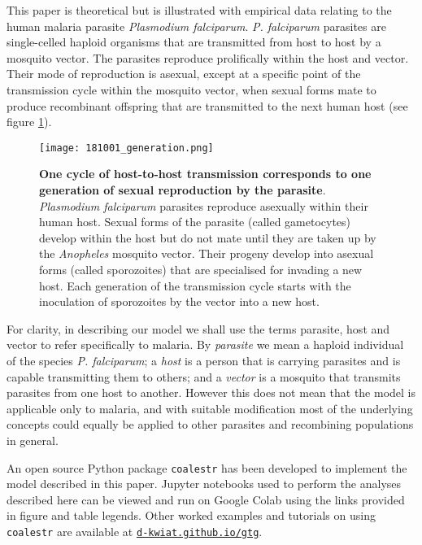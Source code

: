 \documentclass[_main.tex]{subfiles}
\begin{document}
This paper is theoretical but is illustrated with empirical data relating to the human malaria parasite \textit{Plasmodium falciparum}.  \textit{P. falciparum} parasites are single-celled haploid organisms that are transmitted from host to host by a mosquito vector.  The parasites reproduce prolifically within the host and vector.  Their mode of reproduction is asexual, except at a specific point of the transmission cycle within the mosquito vector, when sexual forms mate to produce recombinant offspring that are transmitted to the next human host (see figure \ref{fig:one_generation}).

\begin{figure}[h!]
\centering
\texttt{[image: 181001\_generation.png]}
\caption{\textbf{One cycle of host-to-host transmission corresponds to one generation of sexual reproduction by the parasite}.  \textit{Plasmodium falciparum} parasites reproduce asexually within their human host.  Sexual forms of the parasite (called gametocytes) develop within the host but do not mate until they are taken up by the \textit{Anopheles} mosquito vector.  Their progeny develop into asexual forms (called sporozoites) that are specialised for invading a new host.  Each generation of the transmission cycle starts with the inoculation of sporozoites by the vector into a new host.
}
\label{fig:one_generation}
\end{figure}

For clarity, in describing our model we shall use the terms parasite, host and vector to refer specifically to malaria.  By \textit{parasite} we mean a haploid individual of the species \textit{P. falciparum}; a \textit{host} is a person that is carrying parasites and is capable transmitting them to others; and a \textit{vector} is a mosquito that transmits parasites from one host to another.  However this does not mean that the model is applicable only to malaria, and with suitable modification most of the underlying concepts could equally be applied to other parasites and recombining populations in general. 

An open source Python package \texttt{coalestr} has been developed to implement the model described in this paper.  Jupyter notebooks used to perform the analyses described here can be viewed and run on Google Colab using the links provided in figure and table legends.  Other worked examples and tutorials on using \texttt{coalestr} are available at \href{https://d-kwiat.github.io/gtg}{\texttt{d-kwiat.github.io/gtg}}.  
\end{document}
